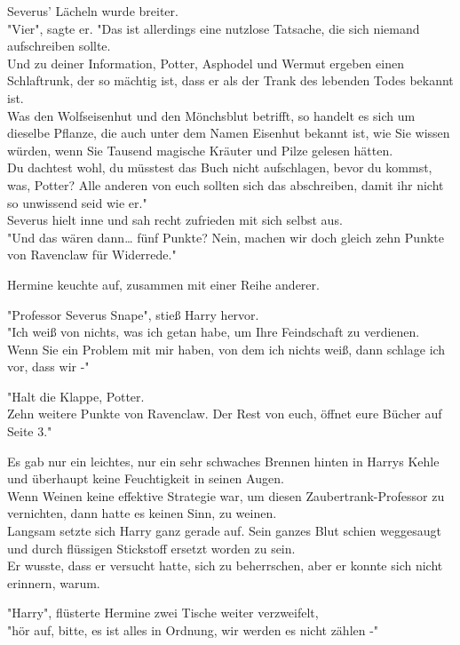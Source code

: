 {Severus' Lächeln wurde breiter.\\ "Vier", sagte er. "Das ist allerdings eine nutzlose Tatsache, die sich niemand aufschreiben sollte.\\ Und zu deiner Information, Potter, Asphodel und Wermut ergeben einen Schlaftrunk, der so mächtig ist, dass er als der Trank des lebenden Todes bekannt ist.\\ Was den Wolfseisenhut und den Mönchsblut betrifft, so handelt es sich um dieselbe Pflanze, die auch unter dem Namen Eisenhut bekannt ist, wie Sie wissen würden, wenn Sie Tausend magische Kräuter und Pilze gelesen hätten.\\ Du dachtest wohl, du müsstest das Buch nicht aufschlagen, bevor du kommst, was, Potter? Alle anderen von euch sollten sich das abschreiben, damit ihr nicht so unwissend seid wie er."\\ Severus hielt inne und sah recht zufrieden mit sich selbst aus.\\ "Und das wären dann… fünf Punkte? Nein, machen wir doch gleich zehn Punkte von Ravenclaw für Widerrede."

Hermine keuchte auf, zusammen mit einer Reihe anderer.

"Professor Severus Snape", stieß Harry hervor.\\ "Ich weiß von nichts, was ich getan habe, um Ihre Feindschaft zu verdienen.\\ Wenn Sie ein Problem mit mir haben, von dem ich nichts weiß, dann schlage ich vor, dass wir -"

"Halt die Klappe, Potter.\\ Zehn weitere Punkte von Ravenclaw. Der Rest von euch, öffnet eure Bücher auf Seite 3."

Es gab nur ein leichtes, nur ein sehr schwaches Brennen hinten in Harrys Kehle und überhaupt keine Feuchtigkeit in seinen Augen.\\ Wenn Weinen keine effektive Strategie war, um diesen Zaubertrank-Professor zu vernichten, dann hatte es keinen Sinn, zu weinen.\\ Langsam setzte sich Harry ganz gerade auf. Sein ganzes Blut schien weggesaugt und durch flüssigen Stickstoff ersetzt worden zu sein.\\ Er wusste, dass er versucht hatte, sich zu beherrschen, aber er konnte sich nicht erinnern, warum.

"Harry", flüsterte Hermine zwei Tische weiter verzweifelt,\\ "hör auf, bitte, es ist alles in Ordnung, wir werden es nicht zählen -"

}
